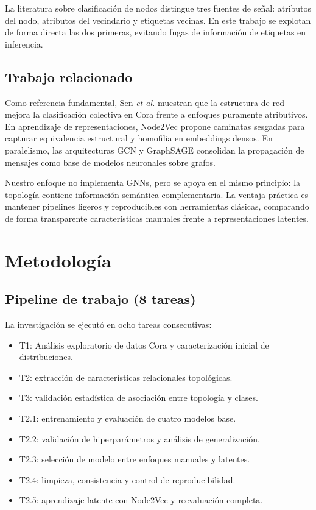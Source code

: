 \documentclass[conference,a4paper]{IEEEtran}
\begin{document}
La literatura sobre clasificación de nodos distingue tres fuentes de señal: atributos del nodo,
atributos del vecindario y etiquetas vecinas. En este trabajo se explotan de forma directa las dos
primeras, evitando fugas de información de etiquetas en inferencia.

\subsection{Trabajo relacionado}

Como referencia fundamental, Sen \textit{et al.} \cite{b1} muestran que la estructura de red mejora
la clasificación colectiva en Cora frente a enfoques puramente atributivos. En aprendizaje de
representaciones, Node2Vec \cite{b3} propone caminatas sesgadas para capturar equivalencia
estructural y homofilia en embeddings densos. En paralelismo, las arquitecturas GCN \cite{b4} y
GraphSAGE \cite{b5} consolidan la propagación de mensajes como base de modelos neuronales sobre
grafos.

Nuestro enfoque no implementa GNNs, pero se apoya en el mismo principio: la topología contiene
información semántica complementaria. La ventaja práctica es mantener pipelines ligeros y
reproducibles con herramientas clásicas, comparando de forma transparente características manuales
frente a representaciones latentes.

\section{\textbf{Metodología}}

\subsection{Pipeline de trabajo (8 tareas)} 

La investigación se ejecutó en ocho tareas consecutivas:
\begin{itemize}
    \item T1: Análisis exploratorio de datos Cora y caracterización inicial de distribuciones.
    \item T2: extracción de características relacionales topológicas.
    \item T3: validación estadística de asociación entre topología y clases.
    \item T2.1: entrenamiento y evaluación de cuatro modelos base.
    \item T2.2: validación de hiperparámetros y análisis de generalización.
    \item T2.3: selección de modelo entre enfoques manuales y latentes.
    \item T2.4: limpieza, consistencia y control de reproducibilidad.
    \item T2.5: aprendizaje latente con Node2Vec y reevaluación completa.
\end{itemize}
\end{document}
